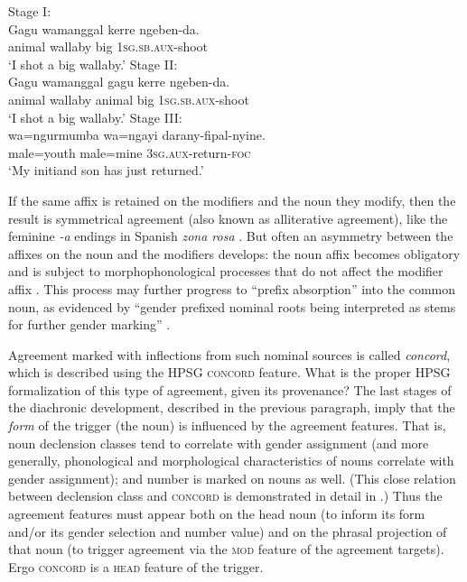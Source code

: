 \documentclass[output=paper
                ,modfonts
                ,nonflat
	        ,collection
	        ,collectionchapter
	        ,collectiontoclongg
 	        ,biblatex
                ,babelshorthands
                ,newtxmath
                ,draftmode
                ,colorlinks, citecolor=brown
]{./langsci/langscibook}
\begin{document}
{\begin{exe}
\ex
\begin{xlist}
\ex \label{wallaby1} Stage I: \\
\gll 	Gagu	   wamanggal	  kerre    ngeben-da. \\
	     animal	wallaby	      big	      1\textsc{sg.sb.aux}-shoot \\
\glt `I shot a big wallaby.’	
\ex \label{wallaby2} Stage II: \\
\gll 	Gagu	   wamanggal	   gagu	kerre	    ngeben-da. \\
	animal	wallaby	  animal     	big	1\textsc{sg.sb.aux}-shoot\\
\glt `I shot a big wallaby.’
\ex \label{wallaby3} Stage III: \\
\gll 	wa=ngurmumba	wa=ngayi	darany-fipal-nyine. \\
	male=youth		male=mine	\textsc{3sg.aux}-return-\textsc{foc} \\
\glt 	`My initiand son has just returned.’ 
\end{xlist}
\end{exe}

\noindent
If the same affix is retained on the modifiers and the noun they modify, then the result is symmetrical agreement (also known as alliterative agreement), like the feminine \textit{-a} endings in Spanish \textit{zona rosa} \citep[87--88]{corbett:2006}.  But often an asymmetry between the affixes on the  noun and the modifiers develops: the noun affix becomes obligatory and is subject to morphophonological processes that do not affect the modifier affix \citep[216]{reid:1997}.    This process may further progress to ``prefix absorption'' into the common noun, as evidenced by ``gender prefixed nominal roots being interpreted as stems for further gender marking'' \citep[217]{reid:1997}.


Agreement marked with inflections from such nominal sources is called \emph{concord}, which is described using the HPSG \textsc{concord} feature.  What is the proper HPSG formalization of this type of agreement, given its provenance?   The last stages of the diachronic development, described in the previous paragraph, imply that the \textit{form} of the trigger (the noun) is influenced by the agreement features.  That is, noun declension classes tend to correlate with gender assignment (and more generally, phonological and morphological characteristics of nouns correlate with gender assignment); and number is marked on nouns as well.  (This close relation between declension class and \textsc{concord} is demonstrated in detail in \citealt[Chapter~2]{Wechsler+Zlatic:2003}.) Thus the agreement features must appear both on the head noun (to inform its form and/or its gender selection and number value) and on the phrasal projection of that noun (to trigger agreement via the \textsc{mod} feature of the agreement targets).  Ergo \textsc{concord} is a \textsc{head} feature of the trigger.  

}
\end{document}
